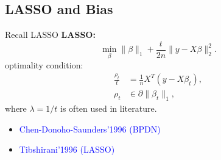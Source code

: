 \documentclass[slidestop,compress,9pt,epsfig,color]{beamer}
\theoremstyle{example}
\begin{document}

\subsection{LASSO and Bias}
\begin{frame}{Recall LASSO}
\textbf{LASSO:}
$$
\min_\beta \|\beta\|_1+\frac{t}{2n}\| y - X\beta \|_2^2.
$$
optimality condition:
\begin{subequations}\label{eq:lasso-kkt}
\begin{align}
\frac{\rho_t}{t}&=\frac{1}{n} X^T(y-X{\beta}_t),\label{eq:lasso-kkta}\\
\rho_t &\in \partial\|{\beta}_t\|_1,
\end{align}
\end{subequations}
where $\lambda = 1/t$ is often used in literature.
\begin{itemize}
\item \textcolor{blue}{Chen-Donoho-Saunders'1996 (BPDN)}
\item \textcolor{blue}{Tibshirani'1996 (LASSO)}
\end{itemize}
\end{frame}
\end{document}
